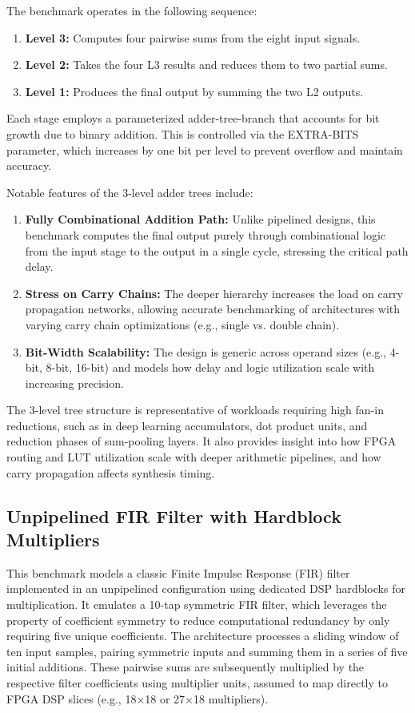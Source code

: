 The benchmark operates in the following sequence:
\begin{enumerate}
	\item \textbf{Level 3:} Computes four pairwise sums from the eight input signals.
	\item \textbf{Level 2:} Takes the four L3 results and reduces them to two partial sums.
	\item \textbf{Level 1:} Produces the final output by summing the two L2 outputs.
\end{enumerate}

Each stage employs a parameterized adder-tree-branch that accounts for bit growth due to binary addition. This is controlled via the EXTRA-BITS parameter, which increases by one bit per level to prevent overflow and maintain accuracy.

Notable features of the 3-level adder trees include:
\begin{enumerate}
	\item \textbf{Fully Combinational Addition Path:} Unlike pipelined designs, this benchmark computes the final output purely through combinational logic from the input stage to the output in a single cycle, stressing the critical path delay.
	\item \textbf{Stress on Carry Chains:} The deeper hierarchy increases the load on carry propagation networks, allowing accurate benchmarking of architectures with varying carry chain optimizations (e.g., single vs. double chain).
	\item \textbf{Bit-Width Scalability:} The design is generic across operand sizes (e.g., 4-bit, 8-bit, 16-bit) and models how delay and logic utilization scale with increasing precision.
\end{enumerate}

The 3-level tree structure is representative of workloads requiring high fan-in reductions, such as in deep learning accumulators, dot product units, and reduction phases of sum-pooling layers. It also provides insight into how FPGA routing and LUT utilization scale with deeper arithmetic pipelines, and how carry propagation affects synthesis timing.

\subsection{Unpipelined FIR Filter with Hardblock Multipliers}
This benchmark models a classic Finite Impulse Response (FIR) filter implemented in an unpipelined configuration using dedicated DSP hardblocks for multiplication. It emulates a 10-tap symmetric FIR filter, which leverages the property of coefficient symmetry to reduce computational redundancy by only requiring five unique coefficients. The architecture processes a sliding window of ten input samples, pairing symmetric inputs and summing them in a series of five initial additions. These pairwise sums are subsequently multiplied by the respective filter coefficients using multiplier units, assumed to map directly to FPGA DSP slices (e.g., 18×18 or 27×18 multipliers).

